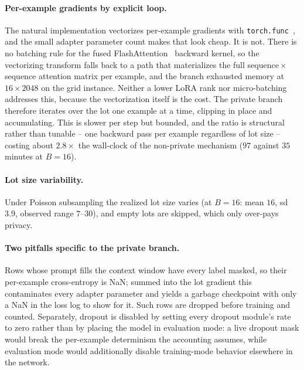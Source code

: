 \paragraph{Per-example gradients by explicit loop.}
The natural implementation vectorizes per-example gradients with \texttt{torch.func}~\citep{paszke2019pytorch},
and the small adapter parameter count makes that look cheap.
It is not.
There is no batching rule for the fused FlashAttention~\citep{dao2022flashattention} backward kernel,
so the vectorizing transform falls back to a path that materializes the full sequence\,$\times$\,sequence attention matrix per example,
and the branch exhausted memory at $16 \times 2048$ on the grid instance.
Neither a lower LoRA rank nor micro-batching addresses this,
because the vectorization itself is the cost.
The private branch therefore iterates over the lot one example at a time,
clipping in place and accumulating.
This is slower per step but bounded,
and the ratio is structural rather than tunable -- one backward pass per example regardless of lot size -- costing about $2.8\times$ the wall-clock of the non-private mechanism ($97$ against $35$ minutes at $B = 16$).

\paragraph{Lot size variability.}
Under Poisson subsampling the realized lot size varies (at $B = 16$: mean $16$, sd $3.9$, observed range $7$--$30$),
and empty lots are skipped,
which only over-pays privacy.

\paragraph{Two pitfalls specific to the private branch.}
Rows whose prompt fills the context window have every label masked,
so their per-example cross-entropy is NaN;
summed into the lot gradient this contaminates every adapter parameter and yields a garbage checkpoint with only a NaN in the loss log to show for it.
Such rows are dropped before training and counted.
Separately,
dropout is disabled by setting every dropout module's rate to zero rather than by placing the model in evaluation mode:
a live dropout mask would break the per-example determinism the accounting assumes,
while evaluation mode would additionally disable training-mode behavior elsewhere in the network.

